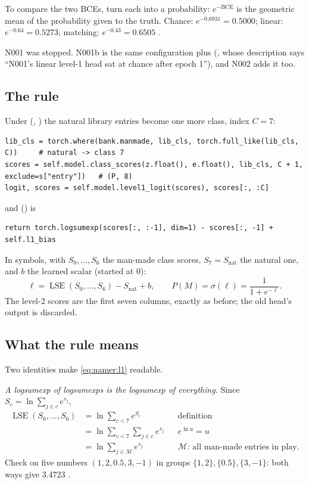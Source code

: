 To compare the two BCEs, turn each into a probability: $e^{-\text{BCE}}$ is the geometric mean of the probability given
to the truth. Chance: $e^{-0.6931}=0.5000$; linear: $e^{-0.64}=0.5273$; matching: $e^{-0.43}=0.6505$ \tagC.

N001 was stopped. N001b is the same configuration plus  (,
whose description says ``N001's linear level-1 head sat at chance after epoch 1''), and N002 adds it too.

\subsection{The rule}

Under  (, ) the natural library entries become one more
class, index $C=7$:
\begin{lstlisting}
lib_cls = torch.where(bank.manmade, lib_cls, torch.full_like(lib_cls, C))     # natural -> class 7
scores = self.model.class_scores(z.float(), e.float(), lib_cls, C + 1, exclude=s["entry"])   # (P, 8)
logit, scores = self.model.level1_logit(scores), scores[:, :C]
\end{lstlisting}
and  () is
\begin{lstlisting}
return torch.logsumexp(scores[:, :-1], dim=1) - scores[:, -1] + self.l1_bias
\end{lstlisting}
In symbols, with $S_0,\dots,S_6$ the man-made class scores, $S_7=S_{\text{nat}}$ the natural one, and $b$ the learned
scalar  (started at 0):
\begin{equation}
\ell=\operatorname{LSE}(S_0,\dots,S_6)-S_{\text{nat}}+b,\qquad P(M)=\sigma(\ell)=\frac{1}{1+e^{-\ell}} .
\label{eq:namer:l1}
\end{equation}
The level-2 scores are the first seven columns, exactly as before; the old head's output is discarded.

\subsection{What the rule means}

Two identities make \cref{eq:namer:l1} readable.

\emph{A logsumexp of logsumexps is the logsumexp of everything.} Since $S_c=\ln\sum_{j\in c}e^{s_j}$,
\begin{align*}
\operatorname{LSE}(S_0,\dots,S_6) &= \ln\sum_{c<7}e^{S_c} &&\text{definition}\\
&= \ln\sum_{c<7}\sum_{j\in c}e^{s_j} &&e^{\ln u}=u\\
&= \ln\sum_{j\in\mathcal{M}}e^{s_j} &&\mathcal{M}\text{: all man-made entries in play.}
\end{align*}
Check on five numbers $(1,2,0.5,3,-1)$ in groups $\{1,2\},\{0.5\},\{3,-1\}$: both ways give 3.4723 \tagC.

